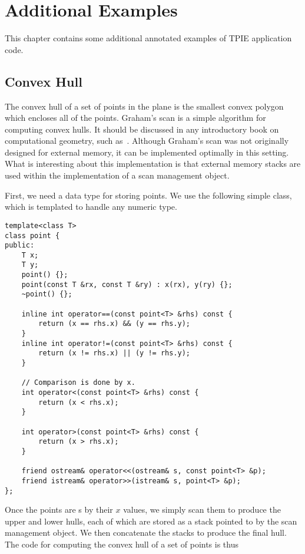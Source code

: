 \chapter{Additional Examples} \label{ch:examples}

This chapter contains some additional annotated examples of 
TPIE application code.

\section{Convex Hull}
\label{sec:convex-hull}

The convex hull of a set of points in the plane is the smallest convex
polygon which encloses all of the points.  Graham's scan is a simple
algorithm for computing convex hulls.  It should be discussed in any
introductory book on computational geometry, such
as~\cite{preparata:computational}.  Although Graham's scan was not
originally designed for external memory, it can be implemented optimally in
this setting.  What is interesting about this implementation is that
external memory stacks are used within the implementation of a scan
management object.

First, we need a data type for storing points.  We use the following
simple class, which is templated to handle any numeric type.

\begin{verbatim}
template<class T>
class point {
public:
    T x;
    T y;
    point() {};
    point(const T &rx, const T &ry) : x(rx), y(ry) {};
    ~point() {};

    inline int operator==(const point<T> &rhs) const {
        return (x == rhs.x) && (y == rhs.y);
    }
    inline int operator!=(const point<T> &rhs) const {
        return (x != rhs.x) || (y != rhs.y);
    }

    // Comparison is done by x.
    int operator<(const point<T> &rhs) const {
        return (x < rhs.x);
    }

    int operator>(const point<T> &rhs) const {
        return (x > rhs.x);
    }
    
    friend ostream& operator<<(ostream& s, const point<T> &p);
    friend istream& operator>>(istream& s, point<T> &p);
};
\end{verbatim}

Once the points are s by their $x$ values, we simply scan them to
produce the upper and lower hulls, each of which are stored as a stack
pointed to by the scan management object.  We then concatenate the
stacks to produce the final hull.  The code for computing the convex
hull of a set of points is thus

